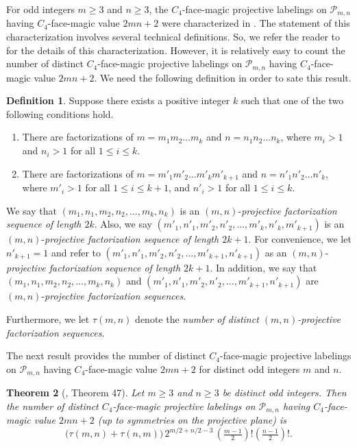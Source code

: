 \documentclass[12pt]{amsart}
\theoremstyle{definition}
\newtheorem{definition}{Definition}
\theoremstyle{plain}
\newtheorem{theorem}[definition]{Theorem}
\begin{document}
For odd integers $m \geqslant 3$ and $n \geqslant 3$, the $C_4$-face-magic projective labelings on $\mathcal{P}_{m,n}$ having $C_4$-face-magic
value $2mn+2$ were characterized in \cite{Curran2}. The statement of this characterization involves several technical definitions.
So, we refer the reader to \cite{Curran2} for the details of this characterization.
However, it is relatively easy to count the number of distinct $C_4$-face-magic projective
labelings on $\mathcal{P}_{m,n}$ having $C_4$-face-magic value $2mn+2$.
We need the following definition in order to sate this result.

\begin{definition} \label{defnProjectiveFactorizationSequence}
  Suppose there exists a positive integer $k$ such that one of the two following conditions hold.
  \begin{enumerate}
    \item There are factorizations of $m=m_1 m_2 \ldots m_{k}$ and $n=n_1 n_2 \ldots n_k$, where $m_i >1$ and $n_i>1$ for all $1 \leqslant i \leqslant k$.
    \item There are factorizations of $m=m'_1 m'_2 \ldots m'_{k}m'_{k+1}$ and $n=n'_1 n'_2 \ldots n'_{k}$,
    where $m'_i >1$ for all $1 \leqslant i \leqslant k+1$, and $n'_i>1$ for all $1 \leqslant i \leqslant k$.
  \end{enumerate}
  We say that $(m_1,n_1,m_2,n_2,\ldots,m_k,n_k)$ is an $(m,n)$-\textit{projective factorization sequence of length $2k$}.
  Also, we say $(m'_1,n'_1,m'_2,n'_2,\ldots,m'_{k},n'_{k},m'_{k+1})$ is an $(m,n)$-\textit{projective factorization sequence of length $2k+1$}.
  For convenience, we let $n'_{k+1}=1$ and refer to
  $(m'_1,n'_1,m'_2,\allowbreak n'_2,\allowbreak \ldots,\allowbreak m'_{k+1},\allowbreak n'_{k+1})$ as an $(m,n)$-\textit{projective factorization sequence of length $2k+1$}.
  In addition, we say that $(m_1,n_1,m_2,n_2,\ldots,m_k,n_k)$ and $(m'_1,n'_1,m'_2,n'_2,\ldots,\allowbreak m'_{k+1},\allowbreak n'_{k+1})$ are
  $(m,n)$-\textit{pro\-jec\-tive factorization sequences}.

  Furthermore, we let $\tau(m,n)$ denote the \textit{number of distinct $(m,n)$-pro\-jec\-tive factorization sequences}.
\end{definition}

The next result provides the number of distinct $C_4$-face-magic projective labelings on $\mathcal{P}_{m,n}$ having
$C_4$-face-magic value $2mn+2$ for distinct odd integers $m$ and $n$.

\begin{theorem}[\cite{Curran2}, Theorem 47] \label{thmNumberOfCentrallyBalancedC4FaceMagicLabelingsOnRectangle}
  Let $m \geqslant 3$ and $n \geqslant 3$ be distinct odd integers.
  Then the number of distinct $C_4$-face-magic projective labelings on $\mathcal{P}_{m,n}$  having $C_4$-face-magic value $2mn+2$
  (up to symmetries on the projective plane) is
  \begin{equation*}
    \bigl( \tau(m,n) + \tau(n,m) \bigr) \, 2^{m/2 +n/2-3} \, (\tfrac{m-1}{2})! (\tfrac{n-1}{2})!.
  \end{equation*}
\end{theorem}
\end{document}
